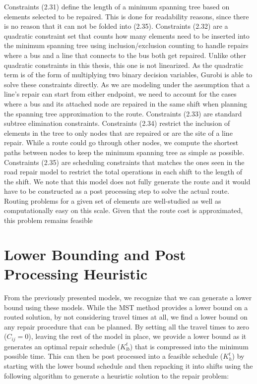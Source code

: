 Constraints (2.31) define the length of a minimum spanning tree based on elements selected to be repaired. This is done for readability reasons, since there is no reason that it can not be folded into (2.35). Constraints (2.32) are a quadratic constraint set that counts how many elements need to be inserted into the minimum spanning tree using inclusion/exclusion counting to handle repairs where a bus and a line that connects to the bus both get repaired. Unlike other quadratic constraints in this thesis, this one is not linearized. As the quadratic term is of the form of multiplying two binary decision variables, Gurobi is able to solve these constraints directly. As we are modeling under the assumption that a line's repair can start from either endpoint, we need to account for the cases where a bus and its attached node are repaired in the same shift when planning the spanning tree approximation to the route. Constraints (2.33) are standard subtree elimination constraints. Constraints (2.34) restrict the inclusion of elements in the tree to only nodes that are repaired or are the site of a line repair. While a route could go through other nodes, we compute the shortest paths between nodes to keep the minimum spanning tree as simple as possible. Constraints (2.35) are scheduling constraints that matches the ones seen in the road repair model to restrict the total operations in each shift to the length of the shift. We note that this model does not fully generate the route and it would have to be constructed as a post processing step to solve the actual route. Routing problems for a given set of elements are well-studied as well as computationally easy on this scale. Given that the route cost is approximated, this problem remains feasible 




\section{Lower Bounding and Post Processing Heuristic}

From the previously presented models, we recognize that we can generate a lower bound using these models. While the MST method provides a lower bound on a routed solution, by not considering travel times at all, we find a lower bound on any repair procedure that can be planned. By setting all the travel times to zero (${C}_{ij} = 0$), leaving the rest of the model in place, we provide a lower bound as it generates an optimal repair schedule ($K_{lb}^t$) that is compressed into the minimum possible time. This can then be post processed into a feasible schedule ($K_{h}^t$) by starting with the lower bound schedule and then repacking it into shifts using the following algorithm to generate a heuristic solution to the repair problem:

